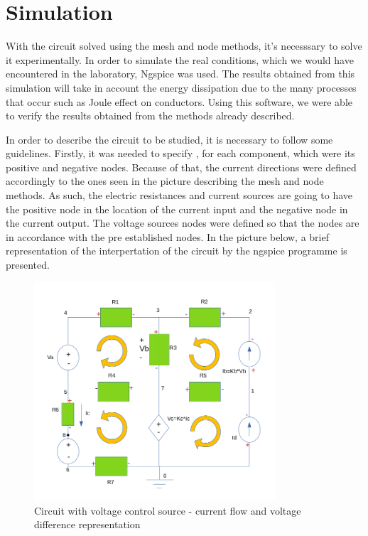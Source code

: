 
\section{Simulation}
\label{sec:simulation}

\par  With the circuit solved using the mesh and node methods, it's necesssary to solve it experimentally. In order to simulate the real conditions, which we would have encountered in the laboratory, Ngspice was used. The results obtained from this simulation will take in account the energy dissipation due to the many processes that occur such as Joule effect on conductors. Using this software, we were able to verify the results obtained from the methods already described. 
\par  In order to describe the circuit to be studied, it is necessary to follow some guidelines. Firstly, it was needed to specify , for each component, which were its positive and negative nodes. Because of that, the current directions were defined accordingly to the ones seen in the picture describing the mesh and node methods. As such, the electric resistances and current sources are going to have the positive node in the location of the current input and the negative node in the current output. The voltage sources nodes were defined so that the nodes are in accordance with the pre established nodes. In the picture below, a brief representation of the interpertation of the circuit by the ngspice programme is presented.

\begin{figure}[H]
\includegraphics[width=0.8\textwidth]{Esquema_salito.PNG}
\centering
\caption{Circuit with voltage control source - current flow and voltage difference representation}
\label{fig:figure5}
\end{figure}

